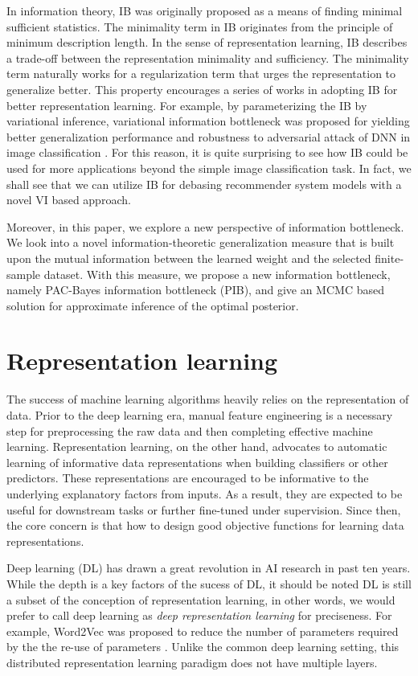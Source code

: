 In information theory, IB was originally proposed as a means of finding minimal sufficient statistics. The minimality term in IB originates from the principle of minimum description length. In the sense of representation learning, IB describes a trade-off between the representation minimality and sufficiency.  The minimality term naturally works for a regularization term that urges the representation to generalize better. This property encourages a series of works in adopting IB for better representation learning. For example, by parameterizing the IB by variational inference, variational information bottleneck was proposed for yielding better generalization performance and robustness to adversarial attack of DNN in image classification \cite{alemi2016deep}. For this reason, it is quite surprising to see how IB could be used for more applications beyond the simple image classification task. In fact, we shall see that we can utilize IB for debasing recommender system models with a novel VI based approach. 

Moreover, in this paper, we explore a new perspective of information bottleneck. We look into a novel information-theoretic generalization measure that is built upon the mutual information between the learned weight and the selected finite-sample dataset. With this measure, we propose a new information bottleneck, namely PAC-Bayes information bottleneck (PIB), and give an MCMC based solution for approximate inference of the optimal posterior.

\section{Representation learning}
The success of machine learning algorithms heavily relies on the representation of data. Prior to the deep learning era, manual feature engineering is a necessary step for preprocessing the raw data and then completing effective machine learning. Representation learning, on the other hand, advocates to automatic learning of informative data representations when building classifiers or other predictors. These representations are encouraged to be informative to the underlying explanatory factors from inputs. As a result, they are expected to be useful for downstream tasks or further fine-tuned under supervision. Since then, the core concern is that how to design good objective functions for learning data representations.

Deep learning (DL) has drawn a great revolution in AI research in past ten years. While the depth is a key factors of the sucess of DL, it should be noted DL is still a subset of the conception of representation learning, in other words, we would prefer to call deep learning as \emph{deep representation learning} for preciseness. For example, Word2Vec was proposed to reduce the number of parameters required by the the re-use of parameters  \cite{mikolov2013distributed}. Unlike the common deep learning setting, this distributed representation learning paradigm does not have multiple layers.

